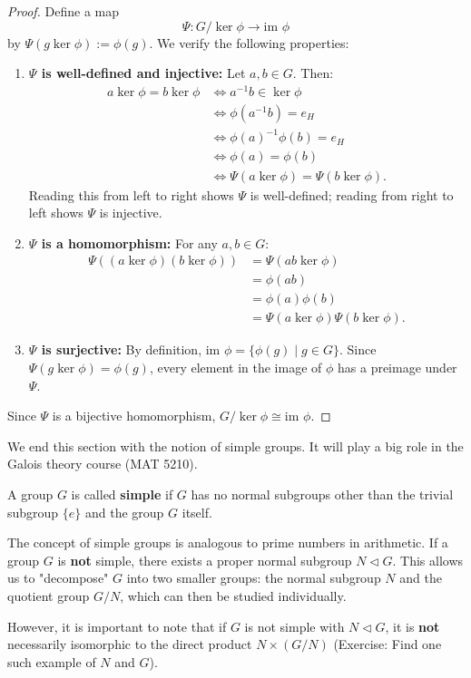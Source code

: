 \begin{proof}
Define a map 
$$\Psi : G/\ker \phi \to \text{im } \phi$$ by $\Psi(g \ker \phi) := \phi(g)$. We verify the following properties:

\begin{enumerate}
    \item \textbf{$\Psi$ is well-defined and injective:} 
    Let $a, b \in G$. Then:
    \begin{align*}
    a \ker \phi = b \ker \phi &\iff a^{-1}b \in \ker \phi \\
    &\iff \phi(a^{-1}b) = e_H \\
    &\iff \phi(a)^{-1}\phi(b) = e_H \\
    &\iff \phi(a) = \phi(b) \\
    &\iff \Psi(a \ker \phi) = \Psi(b \ker \phi).
    \end{align*}
    Reading this from left to right shows $\Psi$ is well-defined; reading from right to left shows $\Psi$ is injective.

    \item \textbf{$\Psi$ is a homomorphism:}
    For any $a, b \in G$:
    \begin{align*}
    \Psi((a \ker \phi)(b \ker \phi)) &= \Psi(ab \ker \phi) \\
    &= \phi(ab) \\
    &= \phi(a)\phi(b) \\
    &= \Psi(a \ker \phi)\Psi(b \ker \phi).
    \end{align*}

    \item \textbf{$\Psi$ is surjective:}
    By definition, $\text{im } \phi = \{ \phi(g) \mid g \in G \}$. Since $\Psi(g \ker \phi) = \phi(g)$, every element in the image of $\phi$ has a preimage under $\Psi$.
\end{enumerate}
Since $\Psi$ is a bijective homomorphism, $G/\ker \phi \cong \text{im } \phi$.
\end{proof}

We end this section with the notion of simple groups. It will play a big role in the Galois theory course (MAT 5210).
\begin{definition}
A group $G$ is called \textbf{simple} if $G$ has no normal subgroups other than the trivial subgroup $\{e\}$ and the group $G$ itself.
\end{definition}

\begin{remark}
The concept of simple groups is analogous to prime numbers in arithmetic. If a group $G$ is \textbf{not} simple, there exists a proper normal subgroup $N \triangleleft G$. This allows us to "decompose" $G$ into two smaller groups: the normal subgroup $N$ and the quotient group $G/N$, which can then be studied individually.

However, it is important to note that if $G$ is not simple with $N \lhd G$, it is \textbf{not} necessarily isomorphic to the direct product $N \times (G/N)$ (Exercise: Find one such example of $N$ and $G$).
\end{remark}

